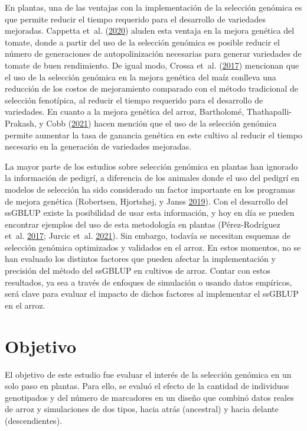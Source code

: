 \documentclass[11pt,spanish,a4paper,oneside,]{book} %
\begin{document}
En plantas, una de las ventajas con la implementación de la selección genómica es que permite reducir el tiempo requerido para el desarrollo de variedades mejoradas. Cappetta et~al. (\protect\hyperlink{ref-cite:64}{2020}) aluden esta ventaja en la mejora genética del tomate, donde a partir del uso de la selección genómica es posible reducir el número de generaciones de autopolinización necesarias para generar variedades de tomate de buen rendimiento. De igual modo, Crossa et~al. (\protect\hyperlink{ref-cite:37}{2017}) mencionan que el uso de la selección genómica en la mejora genética del maíz conlleva una reducción de los costos de mejoramiento comparado con el método tradicional de selección fenotípica, al reducir el tiempo requerido para el desarrollo de variedades. En cuanto a la mejora genética del arroz, Bartholomé, Thathapalli-Prakash, y Cobb (\protect\hyperlink{ref-cite:58}{2021}) hacen mención que el uso de la selección genómica permite aumentar la tasa de ganancia genética en este cultivo al reducir el tiempo necesario en la generación de variedades mejoradas.

La mayor parte de los estudios sobre selección genómica en plantas han ignorado la información de pedigrí, a diferencia de los animales donde el uso del pedigrí en modelos de selección ha sido considerado un factor importante en los programas de mejora genética (Robertsen, Hjortshøj, y Janss \protect\hyperlink{ref-cite:63}{2019}). Con el desarrollo del ssGBLUP existe la posibilidad de usar esta información, y hoy en día se pueden encontrar ejemplos del uso de esta metodología en plantas (Pérez-Rodríguez et~al. \protect\hyperlink{ref-cite:19}{2017}; Jurcic et~al. \protect\hyperlink{ref-cite:11}{2021}). Sin embargo, todavía se necesitan esquemas de selección genómica optimizados y validados en el arroz. En estos momentos, no se han evaluado los distintos factores que pueden afectar la implementación y precisión del método del ssGBLUP en cultivos de arroz. Contar con estos resultados, ya sea a través de enfoques de simulación o usando datos empíricos, será clave para evaluar el impacto de dichos factores al implementar el ssGBLUP en el arroz.

\hypertarget{objetivo}{%
\chapter{Objetivo}\label{objetivo}}

El objetivo de este estudio fue evaluar el interés de la selección genómica en un solo paso en plantas. Para ello, se evaluó el efecto de la cantidad de individuos genotipados y del número de marcadores en un diseño que combinó datos reales de arroz y simulaciones de dos tipos, hacia atrás (ancestral) y hacia delante (descendientes).
\end{document}
